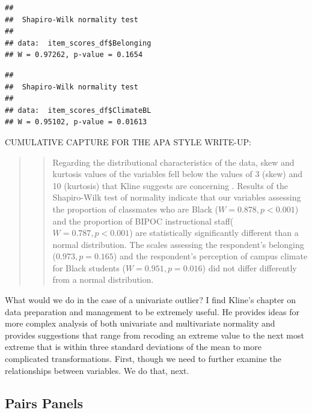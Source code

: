 \documentclass[
  11pt,
]{book}
\newenvironment{Shaded}{\begin{snugshade}}{\end{snugshade}}
\newcommand{\FunctionTok}[1]{\textcolor[rgb]{0.27,0.27,0.27}{\textbf{#1}}}
\newcommand{\NormalTok}[1]{#1}
\newcommand{\SpecialCharTok}[1]{\textcolor[rgb]{0.43,0.43,0.43}{\textbf{#1}}}
\begin{document}
\begin{verbatim}
## 
##  Shapiro-Wilk normality test
## 
## data:  item_scores_df$Belonging
## W = 0.97262, p-value = 0.1654
\end{verbatim}

\begin{Shaded}
\end{Shaded}

\begin{verbatim}
## 
##  Shapiro-Wilk normality test
## 
## data:  item_scores_df$ClimateBL
## W = 0.95102, p-value = 0.01613
\end{verbatim}

CUMULATIVE CAPTURE FOR THE APA STYLE WRITE-UP:

\begin{quote}
\begin{quote}
Regarding the distributional characteristics of the data, skew and kurtosis values of the variables fell below the values of 3 (skew) and 10 (kurtosis) that Kline suggests are concerning \citeyearpar{kline_principles_2016}. Results of the Shapiro-Wilk test of normality indicate that our variables assessing the proportion of classmates who are Black (\(W = 0.878, p < 0.001\)) and the proportion of BIPOC instructional staff(\(W = 0.787, p < 0.001\)) are statistically significantly different than a normal distribution. The scales assessing the respondent's belonging (\(0.973, p = 0.165\)) and the respondent's perception of campus climate for Black students (\(W = 0.951, p = 0.016\)) did not differ differently from a normal distribution.
\end{quote}
\end{quote}

What would we do in the case of a univariate outlier? I find Kline's \citeyearpar{kline_principles_2016} chapter on data preparation and management to be extremely useful. He provides ideas for more complex analysis of both univariate and multivariate normality and provides suggestions that range from recoding an extreme value to the next most extreme that is within three standard deviations of the mean to more complicated transformations. First, though we need to further examine the relationships between variables. We do that, next.

\hypertarget{pairs-panels}{%
\subsection{Pairs Panels}\label{pairs-panels}}
\end{document}

